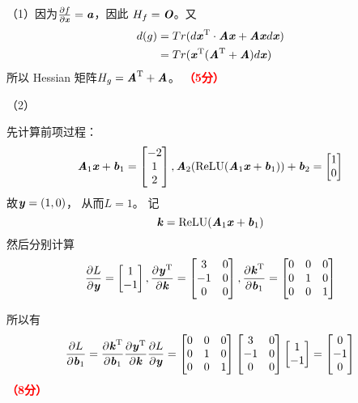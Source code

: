 \documentclass[12pt,a4paper,openany,twoside]{ctexbook}
\begin{document}
\begin{Solution}
	（1）因为$\frac{\partial f}{\partial \Vx} = \Va $，因此 $H_f = \MO$。又
	$$
	\begin{aligned}
		d(g)&= Tr( d\Vx\T \cdot \MA \Vx + \MA \Vx d\Vx)\\
		&=Tr(\Vx\T (\MA\T + \MA) d\Vx)
	\end{aligned}
	$$
	所以 Hessian 矩阵$H_g = \MA\T + \MA$。
	\hfill \textcolor{red}{\textbf{（5分）}}
	
	（2）
	
	先计算前项过程：\[
	\MA_1\Vx+\Vb_1=\begin{bmatrix}
		-2\\1\\2
	\end{bmatrix},	\MA_2(\mathrm{ReLU}(\MA_1\Vx+\Vb_1))+\Vb_2=\begin{bmatrix}
		1\\0
	\end{bmatrix}
	\]
	故$\Vy=(1,0)$，
	从而$L=1$。
	记\[
	\Vk=\mathrm{ReLU}(\MA_1\Vx+\Vb_1)
	\]然后分别计算\[
	\frac{\partial L}{\partial \Vy}=\begin{bmatrix}
		1\\-1
	\end{bmatrix},	\frac{\partial \Vy\T}{\partial \Vk}=\begin{bmatrix}
		3&0\\-1&0 \\0&0
	\end{bmatrix},	\frac{\partial \Vk\T}{\partial \Vb_1}=\begin{bmatrix}
		0&0&0\\0&1&0\\0&0&1
	\end{bmatrix}	
	\]
	
	所以有\[
	\frac{\partial L}{\partial \Vb_1}=\frac{\partial \Vk\T}{\partial \Vb_1}\frac{\partial \Vy\T}{\partial \Vk}\frac{\partial L}{\partial \Vy}	=\begin{bmatrix}
		0&0&0\\0&1&0\\0&0&1
	\end{bmatrix}	\begin{bmatrix}
		3&0\\-1&0\\0&0
	\end{bmatrix}\begin{bmatrix}
		1\\-1
	\end{bmatrix}=\begin{bmatrix}
		0\\-1\\0
	\end{bmatrix}
	\]
	\hfill \textcolor{red}{\textbf{（8分）}}
	
\end{Solution}
\end{document}
